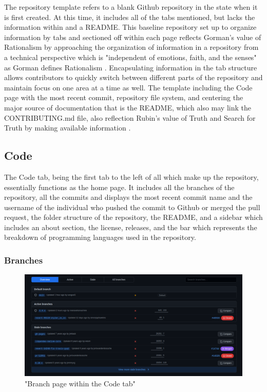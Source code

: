 The repository template refers to a blank Github repository in the state when it is first created. At this time, it includes all of the tabs mentioned, but lacks the information within and a README. This baseline repository set up to organize information by tabs and sectioned off within each page reflects Gorman's value of Rationalism by approaching the organization of information in a repository from a technical perspective which is "independent of emotions, faith, and the senses" as Gorman defines Rationalism \cite{gorman2000values}. Encapsulating information in the tab structure allows contributors to quickly switch between different parts of the repository and maintain focus on one area at a time as well. The template including the Code page with the most recent commit, repository file system, and centering the major source of documentation that is the README, which also may link the CONTRIBUTING.md file, also reflection Rubin's value of Truth and Search for Truth by making available information \cite{rubin2016foundationslis}.

\subsection{Code}

The Code tab, being the first tab to the left of all which make up the repository, essentially functions as the home page. It includes all the branches of the repository, all the commits and displays the most recent commit name and the username of the individual who pushed the commit to Github or merged the pull request, the folder structure of the repository, the README, and a sidebar which includes an about section, the license, releases, and the bar which represents the breakdown of programming languages used in the repository. 

\subsubsection{Branches}

\begin{figure}[hbt!]
\begin{center}
\includegraphics[width=.8\textwidth]{./images/branches.png}
\caption{"Branch page within the Code tab"}
\vspace{0in}
\end{center}
\end{figure}

